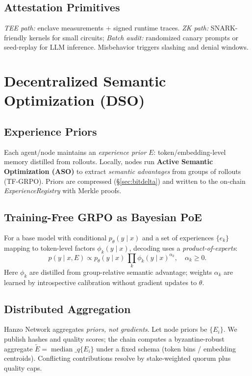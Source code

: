 \documentclass[11pt]{article}
\begin{document}
\subsection{Attestation Primitives}
\emph{TEE path:} enclave measurements + signed runtime traces. \emph{ZK path:} SNARK-friendly kernels for small circuits; \emph{Batch audit:} randomized canary prompts or seed-replay for LLM inference. Misbehavior triggers slashing and denial windows.

\section{Decentralized Semantic Optimization (DSO)}
\subsection{Experience Priors}
Each agent/node maintains an \emph{experience prior} \(E\): token/embedding-level memory distilled from rollouts. Locally, nodes run \textbf{Active Semantic Optimization (ASO)} to extract \emph{semantic advantages} from groups of rollouts (TF-GRPO). Priors are compressed (\S\ref{sec:bitdelta}) and written to the on-chain \emph{ExperienceRegistry} with Merkle proofs.

\subsection{Training-Free GRPO as Bayesian PoE}
For a base model with conditional \(p_\theta(y\mid x)\) and a set of experiences \(\{e_k\}\) mapping to token-level factors \(\phi_k(y\mid x)\), decoding uses a \emph{product-of-experts}:
\begin{equation}\label{eq:poe}
 p(y\mid x,E) \propto p_\theta(y\mid x)\,\prod_{k} \phi_k(y\mid x)^{\alpha_k},\quad \alpha_k\ge 0.
\end{equation}
Here \(\phi_k\) are distilled from group-relative semantic advantage; weights \(\alpha_k\) are learned by introspective calibration without gradient updates to \(\theta\).

\subsection{Distributed Aggregation}
Hanzo Network aggregates \emph{priors, not gradients}. Let node priors be \(\{E_i\}\). We publish hashes and quality scores; the chain computes a byzantine-robust aggregate \(\tilde E = \operatorname{median}\_q\{E_i\}\) under a fixed schema (token bins / embedding centroids). Conflicting contributions resolve by stake-weighted quorum plus quality caps.
\end{document}
